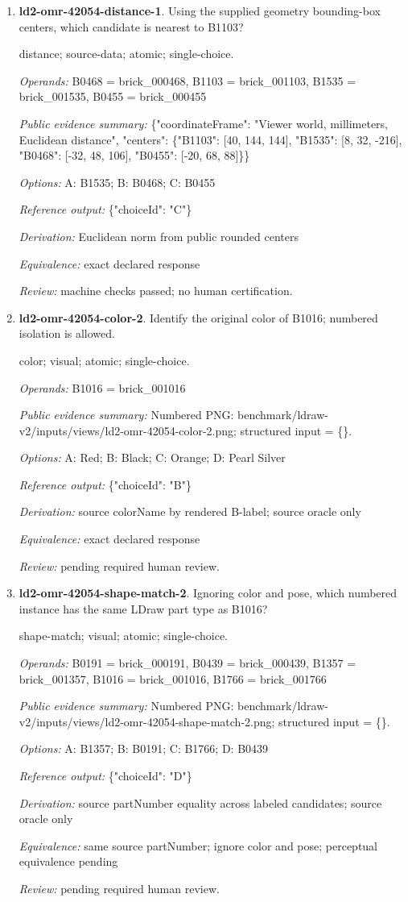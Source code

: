 \begin{enumerate}
\item \textbf{ld2-omr-42054-distance-1}. Using the supplied geometry bounding-box centers, which candidate is nearest to B1103?
\par{\small distance; source-data; atomic; single-choice.\par\textit{Operands:} B0468 = brick\_000468, B1103 = brick\_001103, B1535 = brick\_001535, B0455 = brick\_000455\par\textit{Public evidence summary:} \{"coordinateFrame": "Viewer world, millimeters, Euclidean distance", "centers": \{"B1103": [40, 144, 144], "B1535": [8, 32, -216], "B0468": [-32, 48, 106], "B0455": [-20, 68, 88]\}\}\par\textit{Options:} A: B1535; B: B0468; C: B0455\par\textit{Reference output:} \{"choiceId": "C"\}\par\textit{Derivation:} Euclidean norm from public rounded centers\par\textit{Equivalence:} exact declared response\par\textit{Review:} machine checks passed; no human certification.}
\item \textbf{ld2-omr-42054-color-2}. Identify the original color of B1016; numbered isolation is allowed.
\par{\small color; visual; atomic; single-choice.\par\textit{Operands:} B1016 = brick\_001016\par\textit{Public evidence summary:} Numbered PNG: benchmark/ldraw-v2/inputs/views/ld2-omr-42054-color-2.png; structured input = \{\}.\par\textit{Options:} A: Red; B: Black; C: Orange; D: Pearl Silver\par\textit{Reference output:} \{"choiceId": "B"\}\par\textit{Derivation:} source colorName by rendered B-label; source oracle only\par\textit{Equivalence:} exact declared response\par\textit{Review:} pending required human review.}
\item \textbf{ld2-omr-42054-shape-match-2}. Ignoring color and pose, which numbered instance has the same LDraw part type as B1016?
\par{\small shape-match; visual; atomic; single-choice.\par\textit{Operands:} B0191 = brick\_000191, B0439 = brick\_000439, B1357 = brick\_001357, B1016 = brick\_001016, B1766 = brick\_001766\par\textit{Public evidence summary:} Numbered PNG: benchmark/ldraw-v2/inputs/views/ld2-omr-42054-shape-match-2.png; structured input = \{\}.\par\textit{Options:} A: B1357; B: B0191; C: B1766; D: B0439\par\textit{Reference output:} \{"choiceId": "D"\}\par\textit{Derivation:} source partNumber equality across labeled candidates; source oracle only\par\textit{Equivalence:} same source partNumber; ignore color and pose; perceptual equivalence pending\par\textit{Review:} pending required human review.}

\end{enumerate}
